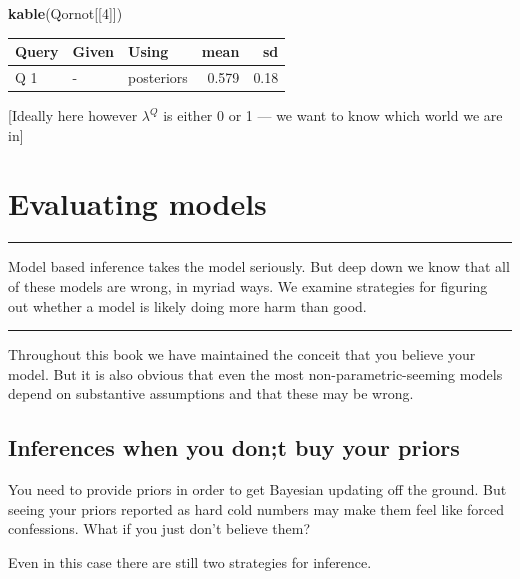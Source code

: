 \documentclass[12pt,]{book}
\newenvironment{Shaded}{\begin{snugshade}}{\end{snugshade}}
\newcommand{\DecValTok}[1]{\textcolor[rgb]{0.00,0.00,0.81}{#1}}
\newcommand{\KeywordTok}[1]{\textcolor[rgb]{0.13,0.29,0.53}{\textbf{#1}}}
\newcommand{\NormalTok}[1]{#1}
\begin{document}
\begin{Shaded}
\begin{Highlighting}[]
\KeywordTok{kable}\NormalTok{(Qornot[[}\DecValTok{4}\NormalTok{]])}
\end{Highlighting}
\end{Shaded}

\begin{tabular}{l|l|l|r|r}
\hline
Query & Given & Using & mean & sd\\
\hline
Q 1 & - & posteriors & 0.579 & 0.18\\
\hline
\end{tabular}

{[}Ideally here however \(\lambda^Q\) is either 0 or 1 --- we want to know which world we are in{]}

\hypertarget{evaluation}{%
\chapter{Evaluating models}\label{evaluation}}

\begin{center}\rule{0.5\linewidth}{\linethickness}\end{center}

Model based inference takes the model seriously. But deep down we know that all of these models are wrong, in myriad ways. We examine strategies for figuring out whether a model is likely doing more harm than good.

\begin{center}\rule{0.5\linewidth}{\linethickness}\end{center}

Throughout this book we have maintained the conceit that you believe your model. But it is also obvious that even the most non-parametric-seeming models depend on substantive assumptions and that these may be wrong.

\hypertarget{inferences-when-you-dont-buy-your-priors}{%
\section{Inferences when you don;t buy your priors}\label{inferences-when-you-dont-buy-your-priors}}

You need to provide priors in order to get Bayesian updating off the ground. But seeing your priors reported as hard cold numbers may make them feel like forced confessions. What if you just don't believe them?

Even in this case there are still two strategies for inference.
\end{document}
